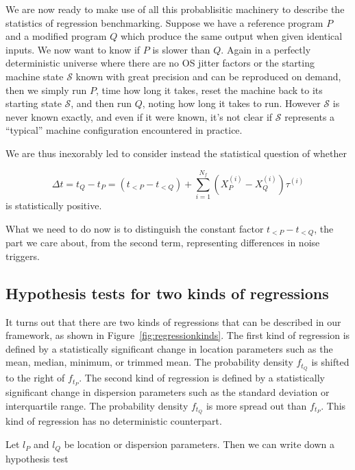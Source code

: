\documentclass[conference]{IEEEtran}
\begin{document}
We are now ready to make use of all this probablisitic machinery to describe the statistics of regression benchmarking. Suppose we have a reference program $P$ and a modified program $Q$ which produce the same output when given identical inputs. We now want to know if $P$ is slower than $Q$. Again in a perfectly deterministic universe where there are no OS jitter factors or the starting machine state $\mathcal S$ known with great precision and can be reproduced on demand, then we simply run $P$, time how long it takes, reset the machine back to its starting state $\mathcal S$, and then run $Q$, noting how long it takes to run. However $\mathcal S$ is never known exactly, and even if it were known, it's not clear if
$\mathcal S$ represents a ``typical'' machine configuration encountered in practice.

We are thus inexorably led to consider instead the statistical question of whether

\begin{equation}
\Delta t = t_Q - t_P
= (t_{<P} - t_{<Q}) + \sum_{i=1}^{N_f} (X^{(i)}_P - X^{(i)}_Q) \tau^{(i)}
\end{equation}
%
is statistically positive.

What we need to do now is to distinguish the constant factor $t_{<P} - t_{<Q}$, the part we care about, from the second term, representing differences in noise triggers.


\subsection{Hypothesis tests for two kinds of regressions}

It turns out that there are two kinds of regressions that can be described in our framework, as shown in Figure~\ref{fig:regressionkinds}. The first kind of regression is defined by a statistically significant change in location parameters such as the mean, median, minimum, or trimmed mean. The probability density $f_{t_Q}$ is shifted to the right of $f_{t_P}$. The second kind of regression is defined by a statistically significant change in dispersion parameters such as the standard deviation or interquartile range. The probability density $f_{t_Q}$ is more spread out than $f_{t_P}$. This kind of regression has no deterministic counterpart.

Let $l_P$ and $l_Q$ be location or dispersion parameters. Then we can write down a hypothesis test
\end{document}
